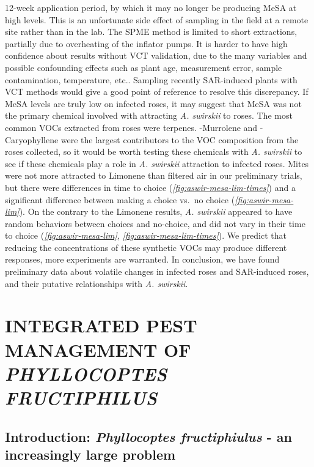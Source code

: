 \documentclass[12pt,final,CPage]{ufthesis}
\begin{document}
{12-week application period, by which it may no longer be producing MeSA at high levels. This is an unfortunate side effect of sampling in the field at a remote site rather than in the lab. The SPME method is limited to short extractions, partially due to overheating of the inflator pumps. It is harder to have high confidence about results without VCT validation, due to the many variables and possible confounding effects such as plant age, measurement error, sample contamination, temperature, etc.. Sampling recently SAR-induced plants with VCT methods would give a good point of reference to resolve this discrepancy. If MeSA levels are truly low on infected roses, it may suggest that MeSA was not the primary chemical involved with attracting \emph{A. swirskii} to roses. The most common VOCs extracted from roses were terpenes. \textgamma-Murrolene and \textbeta-Caryophyllene were the largest contributors to the VOC composition from the roses collected, so it would be worth testing these chemicals with \emph{A. swirskii} to see if these chemicals play a role in \emph{A. swirskii} attraction to infected roses. Mites were not more attracted to Limonene than filtered air in our preliminary trials, but there were differences in time to choice (\emph{\ref{fig:aswir-mesa-lim-times}}) and a significant difference between making a choice vs.~no choice (\emph{\ref{fig:aswir-mesa-lim}}). On the contrary to the Limonene results, \emph{A. swirskii} appeared to have random behaviors between choices and no-choice, and did not vary in their time to choice (\emph{\ref{fig:aswir-mesa-lim}}, \emph{\ref{fig:aswir-mesa-lim-times}}). We predict that reducing the concentrations of these synthetic VOCs may produce different responses, more experiments are warranted. In conclusion, we have found preliminary data about volatile changes in infected roses and SAR-induced roses, and their putative relationships with \emph{A. swirskii}.

  \hypertarget{intro-asm-ipm-pfruct}{%
  \chapter{\texorpdfstring{INTEGRATED PEST MANAGEMENT OF \emph{PHYLLOCOPTES FRUCTIPHILUS}}{INTEGRATED PEST MANAGEMENT OF PHYLLOCOPTES FRUCTIPHILUS}}\label{intro-asm-ipm-pfruct}}

  \hypertarget{intro-ipm-pfruct}{%
  \section{\texorpdfstring{Introduction: \emph{Phyllocoptes fructiphiulus} - an increasingly large problem}{Introduction: Phyllocoptes fructiphiulus - an increasingly large problem}}\label{intro-ipm-pfruct}}

}
\end{document}
